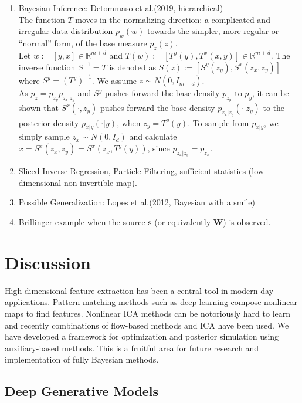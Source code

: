 \documentclass[11pt]{article}%
\begin{document}
\begin{enumerate}
	\item Bayesian Inference: Detommaso et al.(2019, hierarchical)\\
	The function $T$ moves in the normalizing direction: a complicated and irregular data distribution $p_w(w)$ towards the simpler, more regular or “normal” form, of the base measure $p_z(z)$. \\
	
	Let $w := [y, x] \in \mathbb{R}^{m+d}$ and $T(w):= [T^y(y), T^x(x, y)] \in  \mathbb{R}^{m+d}$. The inverse function $S^{-1} = T$ is denoted as $S(z) := [S^{y}(z_y), S^{x}(z_x, z_y)]$ where $S^{y} = (T^y)^{-1}$. We assume $z \sim N(0, I_{m+d})$. \\
	
	As $p_z= p_{z_y} p_{z_x|z_y} $ and $S^{y}$ pushes forward the base density $p_{z_y}$ to $p_y$,  it can be shown that $S^x(\cdot, z_y)$ pushes forward the base density $p_{z_x|z_y}(\cdot | z_y)$ to the posterior density $p_{x|y}(\cdot | y)$, when $z_y = T^y(y)$. To sample from $p_{x|y}$, we simply sample $z_x \sim N(0, I_d)$ and calculate $x = S^{x}(z_x, z_y) = S^{x}(z_x, T^{y}(y))$, since $p_{z_x|z_y} = p_{z_x}$.
	
	\item Sliced Inverse Regression, Particle Filtering, sufficient statistics (low dimensional non invertible map).
	\item Possible Generalization: Lopes et al.(2012, Bayesian with a smile) 
	\item Brillinger example when the source $\bm{s}$ (or equivalently $\bm W$) is observed. 

\end{enumerate}


\section{Discussion}

High dimensional feature extraction has been a central tool in modern day applications. Pattern matching methods such as deep learning compose nonlinear maps to find features. Nonlinear ICA methods can be notoriously hard to learn and recently combinations of flow-based methods and ICA have been used. We have developed a framework for optimization and posterior simulation using auxiliary-based methods. This is a fruitful area for future research and implementation of fully Bayesian methods.  


\subsection{Deep Generative Models}
\end{document}

